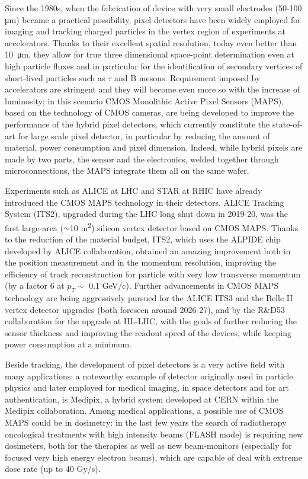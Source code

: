 Since the 1980s, when the fabrication of device with very small electrodes (50-100 \si{\um}) became a practical possibility, pixel detectors have been widely employed for imaging and tracking charged particles in the vertex region of experiments at accelerators. Thanks to their excellent spatial resolution, today even better than \SI{10}{\um}, they allow for true three dimensional space-point determination even at high particle fluxes and in particular for the identification of secondary vertices of short-lived particles such as $\tau$ and B mesons.
Requirement imposed by accelerators are stringent and they will become even more so with the increase of luminosity; in this scenario CMOS Monolithic Active Pixel Sensors (MAPS), based on the technology of CMOS cameras, are being developed to improve the performance of the hybrid pixel detectors, which currently constitute the state-of-art for large scale pixel detector, in particular by reducing the amount of material, power consumption and pixel dimension. Indeed, while hybrid pixels are made by two parts, the sensor and the electronics, welded together through microconnections, the MAPS integrate them all on the same wafer.

Experiments such as ALICE at LHC and STAR at RHIC have already introduced the CMOS MAPS technology in their detectors. ALICE Tracking System (ITS2), upgraded during the LHC long shut down in 2019-20, was the first large-area ($\sim$10 \si{m^2}) silicon vertex detector based on CMOS MAPS. Thanks to the reduction of the material budget, ITS2, which uses the ALPIDE chip developed by ALICE collaboration, obtained an amazing improvement both in the position measurement and in the momentum resolution, improving the efficiency of track reconstruction for particle with very low transverse momentum (by a factor 6 at $p_{T}\sim$ 0.1 \si{GeV/c}).
Further advancements in CMOS MAPS technology are being aggressively pursued for the ALICE ITS3 and the Belle II vertex detector upgrades (both foreseen around 2026-27), and by the R$\&$D53 collaboration for the upgrade at HL-LHC, with the goals of further reducing the sensor thickness and improving the readout speed of the devices, while keeping power consumption at a minimum.

Beside tracking, the development of pixel detectors is a very active field with many applications: a noteworthy example of detector originally used in particle physics and later employed for medical imaging, in space detectors and for art authentication, is Medipix, a hybrid system developed at CERN within the Medipix collaboration.
Among medical applications, a possible use of CMOS MAPS could be in dosimetry: in the last few years the search of radiotherapy oncological treatments with high intensity beams (FLASH mode) is requiring new dosimeters, both for the therapies as well as new beam-monitors (especially for focused very high energy electron beams), which are capable of deal with extreme dose rate (up to 40 \si{Gy/s}).

